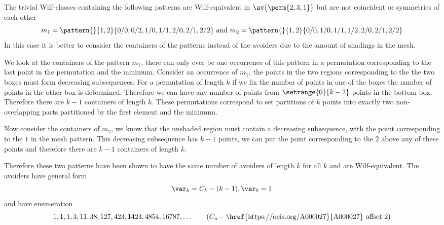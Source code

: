 \subsection{}
\nextvar
The trivial Wilf-classes containing the following patterns are
Wilf-equivalent in \(\av{\perm{2,3,1}}\) but are not coincident or
symmetries of each other
\begin{equation*}
    m_1 = \pattern{}{1,2}{0/0,0/2,
                    1/0,1/1,
                    2/0,2/1,2/2}
    \text{ and }
    m_2 = \pattern{}{1,2}{0/0,
                    1/0,1/1,1/2,
                    2/0,2/1,2/2}
\end{equation*}
In this case it is better to consider the containers of the patterns
instead of the avoiders due to the amount of shadings in the mesh.

We look at the containers of the pattern \(m_1\), there can only ever
be one occurrence of this pattern in a permutation corresponding to
the last point in the permutation and the minimum. Consider an occurrence of \(m_1\),
the points in the two regions corresponding to the the two boxes must form decreasing
subsequences.
For a permutation of length \(k\) if we fix the number of points in
one of the boxes the number of points in the other box is determined.
Therefore we can have any number of points from \(\setrange{0}{k-2}\)
points in the bottom box. Therefore there are \(k-1\) containers of
length \(k\). These permutations correspond to set partitions of \(k\)
points into exactly two non-overlapping parts partitioned by the first
element and the minimum.

Now consider the containers of \(m_2\), we know that the unshaded region
must contain a decreasing subsequence, with the point corresponding to
the \(1\) in the mesh pattern. This decreasing subsequence has \(k-1\)
points, we can put the point corresponding to the \(2\) above any of these
points and therefore there are \(k-1\) containers of length \(k\).

Therefore these two patterns have been shown to have the same number of
avoiders of length \(k\) for all \(k\) and are Wilf-equivalent.
The avoiders have general form
\begin{equation*}
  \var_k = C_k - (k-1), \var_0 = 1
\end{equation*}
and have enumeration
\begin{equation*}
    1, 1, 1, 3, 11, 38, 127, 423, 1423, 4854, 16787,\dotsc \tag{\(C_n -\) \href{https://oeis.org/A000027}{A000027} offset 2}
\end{equation*}

